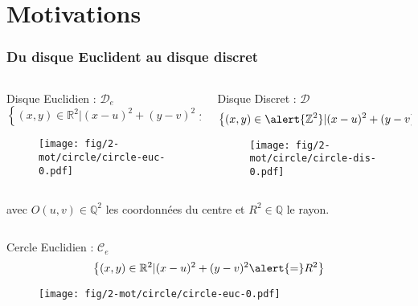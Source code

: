 \section{Motivations}

\begin{frame}
\frametitle{Du disque Euclident au disque discret}
{
  \begin{columns}[t]
    \begin{column}{0.5\linewidth}
      \begin{block}{Disque Euclidien : $\mathcal{D}_e$}
        $$\left\{ (x,y) \in \mathbb{R}^{2} | (x - u)^2 + (y - v)^2 \leq R^2 \right\}$$
        \begin{figure}[h!]
          \centering
          \texttt{[image: fig/2-mot/circle/circle-euc-0.pdf]}
        \end{figure}
      \end{block}
    
    \end{column}
    \begin{column}{0.5\linewidth}
      \begin{block}{Disque Discret : $\mathcal{D}$}
        $$\left\{ (x,y) \in \alert{\mathbb{Z}^{2}} | (x - u)^2 + (y - v)^2 \leq R^2 \right\}$$

        \begin{figure}[h!]
          \centering
          \texttt{[image: fig/2-mot/circle/circle-dis-0.pdf]}
        \end{figure}
      \end{block}  
    \end{column}
  \end{columns} 

  \begin{exampleblock}{}
  avec $O(u,v) \in \mathbb{Q}^{2}$ les coordonnées du centre et $R^2 \in \mathbb{Q}$ le rayon.\\
  \end{exampleblock}
}
        
{
  \begin{columns}[t]
    \begin{column}{0.5\linewidth}
      \begin{block}{Cercle Euclidien : $\mathcal{C}_e$}
        $$\left\{ (x,y) \in \mathbb{R}^{2} | (x - u)^2 + (y - v)^2 \alert{=} R^2 \right\}$$
        \begin{figure}[h!]
          \centering
          \texttt{[image: fig/2-mot/circle/circle-euc-0.pdf]}
        \end{figure}
      \end{block}
    

\end{column}
\end{columns}}
\end{frame}

